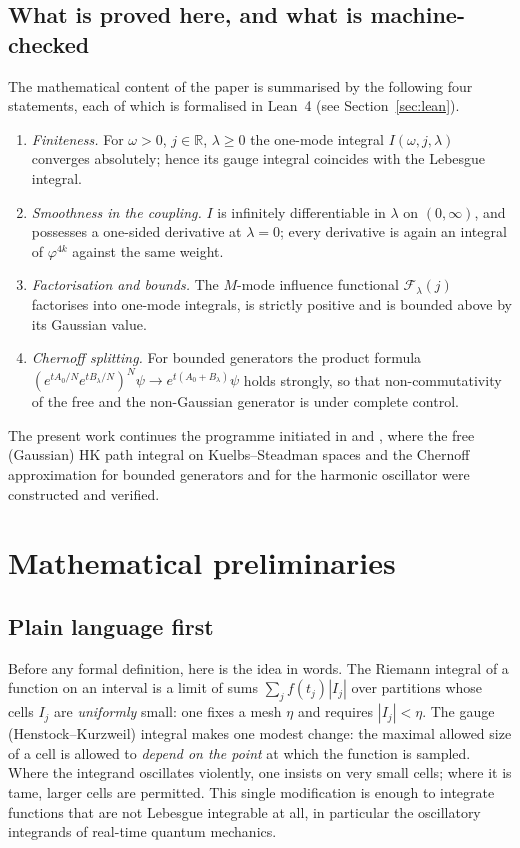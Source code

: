 \documentclass[11pt,a4paper]{article}
\theoremstyle{plain}
\theoremstyle{definition}
\theoremstyle{remark}
\newcommand{\R}{\mathbb{R}}
\begin{document}
\subsection{What is proved here, and what is machine-checked}

The mathematical content of the paper is summarised by the following four statements,
each of which is formalised in Lean~4 (see Section~\ref{sec:lean}).

\begin{enumerate}
\item[(A)] \emph{Finiteness.} For $\omega>0$, $j\in\R$, $\lambda\ge0$ the one-mode
integral $I(\omega,j,\lambda)$ converges absolutely; hence its gauge integral coincides
with the Lebesgue integral.
\item[(B)] \emph{Smoothness in the coupling.} $I$ is infinitely differentiable in
$\lambda$ on $(0,\infty)$, and possesses a one-sided derivative at $\lambda=0$; every
derivative is again an integral of $\varphi^{4k}$ against the same weight.
\item[(C)] \emph{Factorisation and bounds.} The $M$-mode influence functional
$\mathcal{F}_\lambda(j)$ factorises into one-mode integrals, is strictly positive and is
bounded above by its Gaussian value.
\item[(D)] \emph{Chernoff splitting.} For bounded generators the product formula
$(e^{tA_0/N}e^{tB_\lambda/N})^{N}\psi\to e^{t(A_0+B_\lambda)}\psi$ holds strongly, so that
non-commutativity of the free and the non-Gaussian generator is under complete control.
\end{enumerate}

The present work continues the programme initiated in \cite{Berdinsky2026HK} and
\cite{BerdinskyUshakov2026}, where the free (Gaussian) HK path integral on
Kuelbs--Steadman spaces and the Chernoff approximation for bounded generators and for the
harmonic oscillator were constructed and verified.

\section{Mathematical preliminaries}
\label{sec:prelim}

\subsection{Plain language first}

Before any formal definition, here is the idea in words. The Riemann integral of a
function on an interval is a limit of sums $\sum_j f(t_j)|I_j|$ over partitions whose
cells $I_j$ are \emph{uniformly} small: one fixes a mesh $\eta$ and requires
$|I_j|<\eta$. The gauge (Henstock--Kurzweil) integral makes one modest change: the
maximal allowed size of a cell is allowed to \emph{depend on the point} at which the
function is sampled. Where the integrand oscillates violently, one insists on very small
cells; where it is tame, larger cells are permitted. This single modification is enough
to integrate functions that are not Lebesgue integrable at all, in particular the
oscillatory integrands of real-time quantum mechanics.
\end{document}
